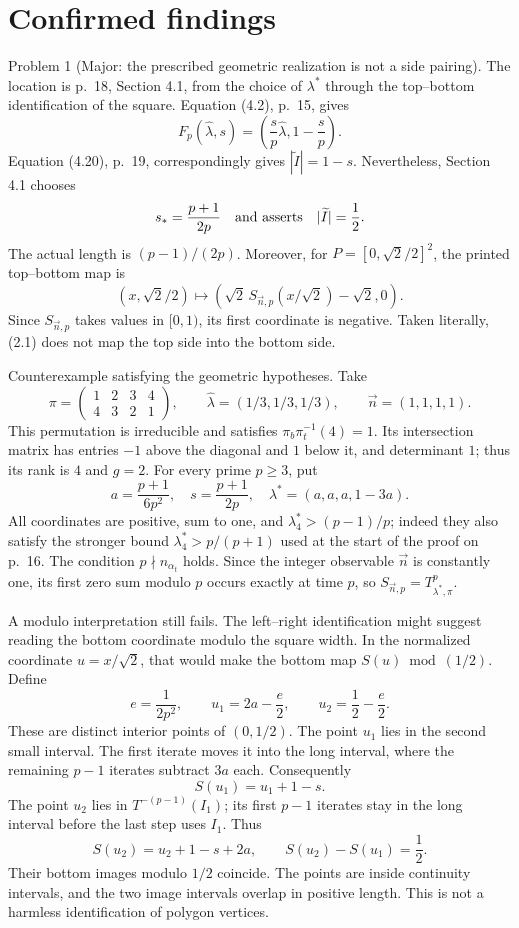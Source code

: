 \documentclass[10pt]{article}
\begin{document}
\section*{Confirmed findings}
Problem 1 (Major: the prescribed geometric realization is not a side pairing).  The location is p. 18, Section 4.1, from the choice of \(\lambda^*\) through the top–bottom identification of the square. Equation (4.2), p. 15, gives \[F_p(\widehat\lambda,s)
 =\left(\frac{s}{p}\widehat\lambda,1-\frac{s}{p}\right).\] Equation (4.20), p. 19, correspondingly gives \(|\widetilde I|=1-s\). Nevertheless, Section 4.1 chooses \[s_*=\frac{p+1}{2p}
 \quad\hbox{and asserts}\quad |\widetilde I|=\frac12.\] The actual length is \((p-1)/(2p)\). Moreover, for \(P=[0,\sqrt2/2]^2\), the printed top–bottom map is \[(x,\sqrt2/2)\longmapsto
 \left(\sqrt2\,S_{\vec n,p}(x/\sqrt2)-\sqrt2,0\right).
 \tag{2.1}\] Since \(S_{\vec n,p}\) takes values in \([0,1)\), its first coordinate is negative. Taken literally, (2.1) does not map the top side into the bottom side.\par
Counterexample satisfying the geometric hypotheses. Take \[\pi=\begin{pmatrix}1&2&3&4\\4&3&2&1\end{pmatrix},\qquad
 \widehat\lambda=(1/3,1/3,1/3),\qquad
 \vec n=(1,1,1,1).\] This permutation is irreducible and satisfies \(\pi_b\pi_t^{-1}(4)=1\). Its intersection matrix has entries \(-1\) above the diagonal and \(1\) below it, and determinant \(1\); thus its rank is \(4\) and \(g=2\). For every prime \(p\ge3\), put \[a=\frac{p+1}{6p^2},\quad
 s=\frac{p+1}{2p},\quad
 \lambda^*=(a,a,a,1-3a).\] All coordinates are positive, sum to one, and \(\lambda^*_4>(p-1)/p\); indeed they also satisfy the stronger bound \(\lambda^*_4>p/(p+1)\) used at the start of the proof on p. 16. The condition \(p\nmid n_{\alpha_t}\) holds. Since the integer observable \(\vec n\) is constantly one, its first zero sum modulo \(p\) occurs exactly at time \(p\), so \(S_{\vec n,p}=T_{\lambda^*,\pi}^{p}\).\par
A modulo interpretation still fails. The left–right identification might suggest reading the bottom coordinate modulo the square width. In the normalized coordinate \(u=x/\sqrt2\), that would make the bottom map \(S(u)\bmod(1/2)\). Define \[e=\frac{1}{2p^2},\qquad
 u_1=2a-\frac e2,\qquad
 u_2=\frac12-\frac e2 .\] These are distinct interior points of \((0,1/2)\). The point \(u_1\) lies in the second small interval. The first iterate moves it into the long interval, where the remaining \(p-1\) iterates subtract \(3a\) each. Consequently \[S(u_1)=u_1+1-s.\] The point \(u_2\) lies in \(T^{-(p-1)}(I_1)\); its first \(p-1\) iterates stay in the long interval before the last step uses \(I_1\). Thus \[S(u_2)=u_2+1-s+2a,\qquad S(u_2)-S(u_1)=\frac12.\] Their bottom images modulo \(1/2\) coincide. The points are inside continuity intervals, and the two image intervals overlap in positive length. This is not a harmless identification of polygon vertices.\par
\end{document}
